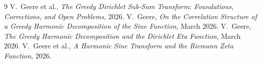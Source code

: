 \documentclass[11pt,a4paper]{article}
\theoremstyle{definition}
\theoremstyle{remark}
\begin{document}
\begin{thebibliography}{9}
V.~Geere et al., \emph{The Greedy Dirichlet Sub‑Sum Transform: Foundations, Corrections, and Open Problems}, 2026.
V.~Geere, \emph{On the Correlation Structure of a Greedy Harmonic Decomposition of the Sine Function}, March 2026.
V.~Geere, \emph{The Greedy Harmonic Decomposition and the Dirichlet Eta Function}, March 2026.
V.~Geere et al., \emph{A Harmonic Sine Transform and the Riemann Zeta Function}, 2026.
\end{thebibliography}
\end{document}
